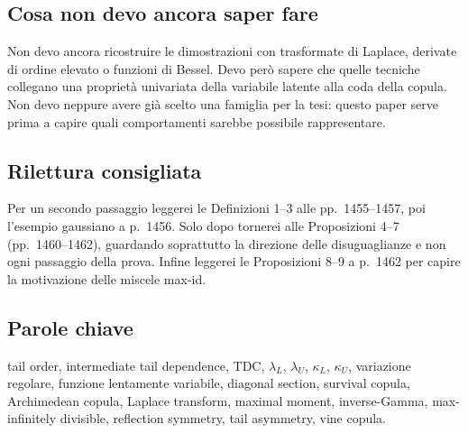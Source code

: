 \documentclass[11pt,a4paper]{article}
\begin{document}
\subsection*{Cosa non devo ancora saper fare}
Non devo ancora ricostruire le dimostrazioni con trasformate di Laplace,
derivate di ordine elevato o funzioni di Bessel. Devo però sapere che quelle
tecniche collegano una proprietà univariata della variabile latente alla coda
della copula. Non devo neppure avere già scelto una famiglia per la tesi:
questo paper serve prima a capire quali comportamenti sarebbe possibile
rappresentare.

\subsection*{Rilettura consigliata}
Per un secondo passaggio leggerei le Definizioni 1--3 alle pp.~1455--1457,
poi l'esempio gaussiano a p.~1456. Solo dopo tornerei alle Proposizioni 4--7
(pp.~1460--1462), guardando soprattutto la direzione delle disuguaglianze e
non ogni passaggio della prova. Infine leggerei le Proposizioni 8--9 a p.~1462
per capire la motivazione delle miscele max-id.

\subsection*{Parole chiave}
tail order, intermediate tail dependence, TDC, $\lambda_L$, $\lambda_U$,
$\kappa_L$, $\kappa_U$, variazione regolare, funzione lentamente variabile,
diagonal section, survival copula, Archimedean copula, Laplace transform,
maximal moment, inverse-Gamma, max-infinitely divisible, reflection symmetry,
tail asymmetry, vine copula.
\end{document}

